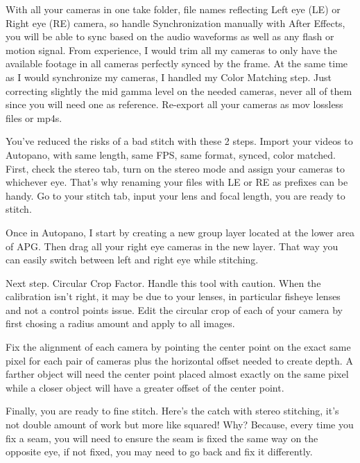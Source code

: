 \begin{fullwidth}
With all your cameras in one take folder, file names reflecting Left eye (LE) or Right eye (RE) camera, so handle Synchronization manually with After Effects, you will be able to sync based on the audio waveforms as well as any flash or motion signal. From experience, I would trim all my cameras to only have the available footage in all cameras perfectly synced by the frame. At the same time as I would synchronize my cameras, I handled my Color Matching step. Just correcting slightly the mid gamma level on the needed cameras, never all of them since you will need one as reference. Re-export all your cameras as mov lossless files or mp4s.


You’ve reduced the risks of a bad stitch with these 2 steps. Import your videos to Autopano, with same length, same FPS, same format, synced, color matched. First, check the stereo tab, turn on the stereo mode and assign your cameras to whichever eye. That’s why renaming your files with LE or RE as prefixes can be handy. Go to your stitch tab, input your lens and focal length, you are ready to stitch. 


Once in Autopano, I start by creating a new group layer located at the lower area of APG. Then drag all your right eye cameras in the new layer. That way you can easily switch between left and right eye while stitching.


Next step. Circular Crop Factor. Handle this tool with caution. When the calibration isn't right, it may be due to your lenses, in particular fisheye lenses and not a control points issue. Edit the circular crop of each of your camera by first chosing a radius amount and apply to all images. 


Fix the alignment of each camera by pointing the center point on the exact same pixel for each pair of cameras plus the horizontal offset needed to create depth. A farther object will need the center point placed almost exactly on the same pixel while a closer object will have a greater offset of the center point. 



Finally, you are ready to fine stitch. Here’s the catch with stereo stitching, it’s not double amount of work but more like squared! Why? Because, every time you fix a seam, you will need to ensure the seam is fixed the same way on the opposite eye, if not fixed, you may need to go back and fix it differently. 


\end{fullwidth}
